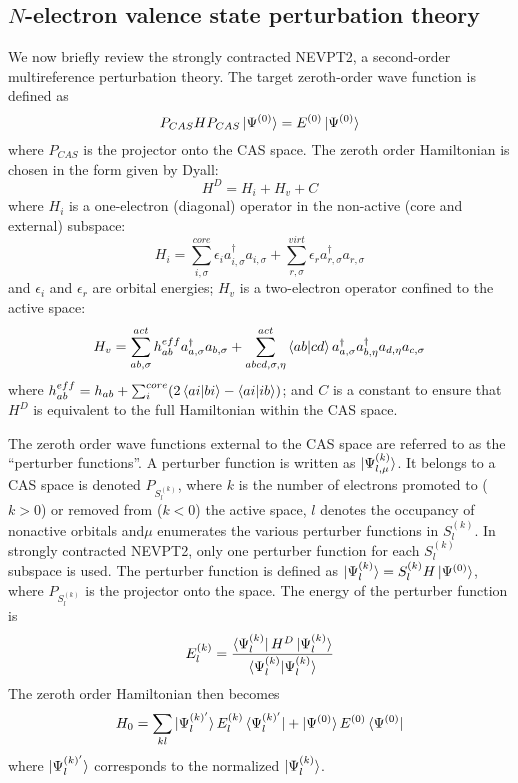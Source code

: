 \subsection{$N$-electron valence state perturbation theory} 

We now briefly review the strongly contracted NEVPT2\cite{angeli_n-electron_2001, angeli_n-electron_2002}, a second-order 
multireference perturbation theory. The target zeroth-order wave function is defined as 
\begin{equation}
P_{CAS}HP_{CAS} \ket{\Psi^{(0)}} = E^{(0)} \ket{\Psi^{(0)}}
\end{equation}
where $P_{CAS}$ is the projector onto the CAS space. 
The zeroth order Hamiltonian is chosen in the form given by Dyall\cite{dyall_choice_1995}:
\begin{equation}
  H^D = H_i + H_v + C
\end{equation}
where $H_i$ is a one-electron (diagonal) operator in the non-active (core and external) subspace:
\begin{equation}
  H_i = \sum_{i,\sigma}^{core} \epsilon_i  a^\dagger_{i,\sigma} a_{i,\sigma} + \sum_{r,\sigma}^{virt} \epsilon_r  a^\dagger_{r,\sigma} a_{r,\sigma}
\end{equation}
and $\epsilon_i $ and $\epsilon_r$ are orbital energies; 
$H_v$ is a two-electron operator confined to the active space:
\begin{equation}
  H_v = \sum_{ab,\sigma}^{act} h^{eff}_{ab}  a^\dagger_{a,\sigma}  a_{b,\sigma} + \sum_{abcd,\sigma,\eta}^{act} \braket{ab|cd}  a^\dagger_{a,\sigma} a^\dagger_{b,\eta} a_{d,\eta} a_{c,\sigma}
\end{equation}
where $h_{ab}^{eff} = h_{ab} + \sum_{i}^{core} (2\braket{ai|bi}-\braket{ai|ib})$;
and $C$ is a constant to ensure that $H^D$ is equivalent to the full Hamiltonian within the CAS space.

The zeroth order wave functions external to the CAS space are referred to as the ``perturber functions''. A perturber function is written  as $\ket{\Psi^{(k)}_{l,\mu}}$.
It belongs to a CAS space is denoted $P_{S_l^{(k)}}$, where $k$ is the number of electrons promoted to ($k>0$) or removed from ($k<0$) the active space, $l$ denotes the occupancy of nonactive orbitals and$\mu$ enumerates the various perturber functions in $S_l^{(k)}$.  
In strongly contracted NEVPT2, only one perturber function for each $S_l^{(k)}$ subspace is used. The perturber function is defined as $\ket{\Psi^{(k)}_l} = S^{(k)}_l H \ket{\Psi^{(0)}}$, where $P_{S_l^{(k)}}$ is the projector onto the space. The energy of
the perturber function is
\begin{equation}
  E^{(k)}_l = \frac{\bra{\Psi^{(k)}_l}H^D\ket{\Psi^{(k)}_l}}{\braket{\Psi^{(k)}_l|\Psi^{(k)}_l}}
\end{equation}
The zeroth order Hamiltonian then becomes
\begin{equation}
  H_0 = \sum_{kl} \ket{\Psi^{(k)'}_l}E^{(k)}_l \bra{\Psi^{(k)'}_l} +\ket{\Psi^{(0)}}E^{(0)} \bra{\Psi^{(0)}}
\end{equation}
where $\ket{\Psi^{(k)'}_l}$ corresponds to the normalized $\ket{\Psi^{(k)}_l}$.

